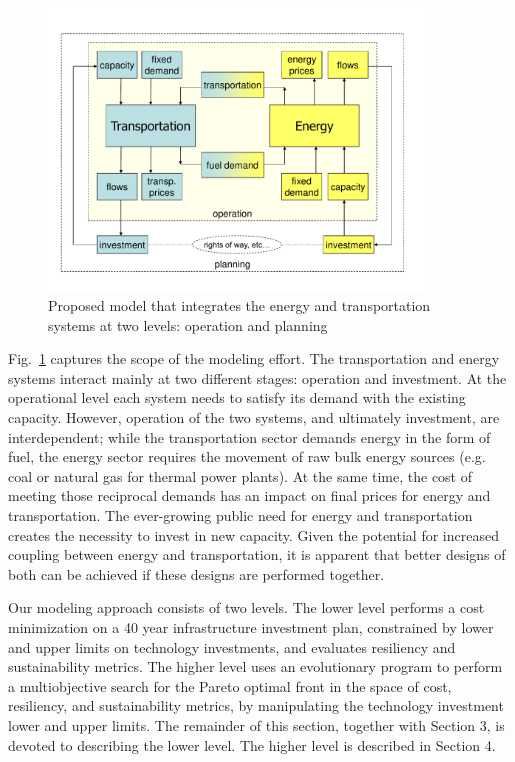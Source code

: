 \documentclass{article}
\begin{document}
\begin{figure}
\begin{center}
\includegraphics[width = 100mm]{figs/modeling_approach}
\end{center}
\caption{Proposed model that integrates the energy and transportation systems at two levels: operation and planning}
\label{fig:proposedmodel}
\end{figure}

Fig.~\ref{fig:proposedmodel} captures the scope of the modeling effort. The transportation and energy systems interact mainly at two different stages: operation and investment. At the operational level each system needs to satisfy its demand with the existing capacity. However, operation of the two systems, and ultimately investment, are interdependent; while the transportation sector demands energy in the form of fuel, the energy sector requires the movement of raw bulk energy sources (e.g. coal or natural gas for thermal power plants). At the same time, the cost of meeting those reciprocal demands has an impact on final prices for energy and transportation. The ever-growing public need for energy and transportation creates the necessity to invest in new capacity. Given the potential for increased coupling between energy and transportation, it is apparent that better designs of both can be achieved if these designs are performed together.

Our modeling approach consists of two levels. The lower level performs a cost minimization on a 40 year infrastructure investment plan, constrained by lower and upper limits on technology investments, and evaluates resiliency and sustainability metrics. The higher level uses an evolutionary program to perform a multiobjective search for the Pareto optimal front in the space of cost, resiliency, and sustainability metrics, by manipulating the technology investment lower and upper limits. The remainder of this section, together with Section 3, is devoted to describing the lower level. The higher level is described in Section 4.
\end{document}
